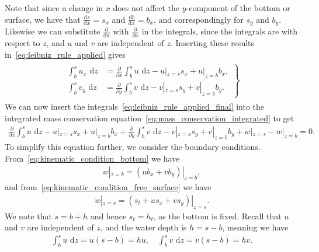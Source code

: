 Note that since a change in $x$ does not affect the $y$-component of the bottom or surface, we have that $\frac{\text{d} s}{\text{d} x} = s_x$ and $ \frac{\text{d} b}{\text{d} x} = b_x$, and correspondingly for $s_y$ and $b_y$.
Likewise we can substitute $\frac{\text{d}}{\text{dx}}$ with $\frac{\partial}{\partial x}$ in the integrals, since the integrals are with respect to $z$, and $u$ and $v$ are independent of $z$.
Inserting these results in~\eqref{eq:leibniz_rule_applied} gives
\begin{align}\label{eq:leibniz_rule_applied_final}
    \begin{gathered}
        \left.
            \begin{aligned}
                \int_{b}^{s} u_x \text{ d} z &=  \frac{\partial}{\partial x}  \int_{b}^{s} u \text{ d} z  - u|_{z = s} s_x + u|_{z = b} b_x, \\
                \int_{b}^{s} v_y \text{ d} z &= \frac{\partial}{\partial y}  \int_{b}^{s} v \text{ d} z  - v|_{z = s} s_y + v|_{z = b} b_y.
            \end{aligned}
        \right\}
    \end{gathered}
\end{align}
We can now insert the integrals~\eqref{eq:leibniz_rule_applied_final} into the integrated mass conservation equation~\eqref{eq:mass_conservation_integrated} to get
\begin{align}\label{eq:mass_conservation_integrated_final}
    \frac{\partial}{\partial x}  \int_{b}^{s} u \text{ d} z  - u|_{z = s} s_x + u|_{z = b} b_x
    + \frac{\partial}{\partial y}  \int_{b}^{s} v \text{ d} z  - v|_{z = s} s_y + v|_{z = b} b_y
    + w|_{z = s} - w|_{z = b} = 0.
\end{align}
To simplify this equation further, we consider the boundary conditions.
From~\eqref{eq:kinematic_condition_bottom} we have
\begin{align}
    w|_{z = b} = (u b_x + v b_y)|_{z = b},
\end{align}
and from~\eqref{eq:kinematic_condition_free_surface} we have
\begin{align}
    w|_{z = s} = (s_t + u s_x + v s_y)|_{z = s}.
\end{align}
We note that $s = b + h$ and hence $s_t = h_t$, as the bottom is fixed.
Recall that $u$ and $v$ are independent of $z$, and the water depth is $h = s - b$, meaning we have
\begin{align*}
    \int_{b}^{s} u \text{ d} z = u(s - b) = hu, \quad \int_{b}^{s} v \text{ d} z = v(s - b) = hv.
\end{align*}
